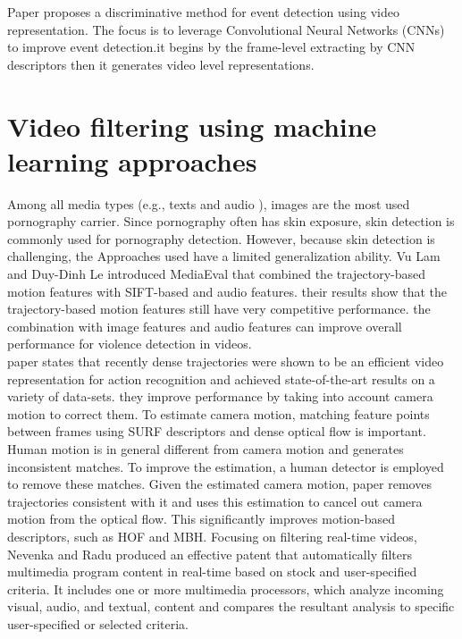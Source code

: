 \documentclass[runningheads]{llncs}
\begin{document}
Paper \cite{xu2015discriminative} proposes a discriminative method for event detection using video representation. The focus is to leverage Convolutional Neural Networks (CNNs) to improve event detection.it begins by the frame-level extracting by CNN descriptors then it generates video level representations.\\

\section{Video filtering using machine learning approaches}

Among all media types (e.g., texts and audio ), images are the most used pornography carrier. Since pornography often has skin exposure, skin detection is commonly used for pornography detection. However, because skin detection is challenging, the Approaches used have a limited generalization ability. Vu Lam and Duy-Dinh Le introduced MediaEval \cite{demarty2013mediaeval} that combined the trajectory-based motion features with SIFT-based and audio features. their results show that the trajectory-based motion features still have very competitive performance. the combination with image features and audio features can improve overall performance for violence detection in videos.\\

paper \cite{wang2013action} states that recently dense trajectories were shown to be an efficient video representation for action recognition and achieved state-of-the-art results on a variety of data-sets. they improve performance by taking into account camera motion to correct them. To estimate camera motion, matching feature points between frames using SURF descriptors and dense optical flow is important.\\

Human motion is in general different from camera motion and generates inconsistent matches. To improve the estimation, a human detector is employed to remove these matches. Given the estimated camera motion, paper \cite{wang2013action} removes trajectories consistent with it and uses this estimation to cancel out camera motion from the optical flow. This significantly improves motion-based descriptors, such as HOF and MBH. Focusing on filtering real-time videos, Nevenka and Radu produced an effective patent \cite{dimitrova2015system} that automatically filters multimedia program content in real-time based on stock and user-specified criteria. It includes one or more multimedia processors, which analyze incoming visual, audio, and textual, content and compares the resultant analysis to specific user-specified or selected criteria.\\
\end{document}
